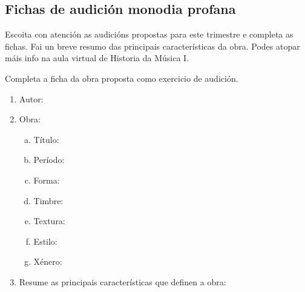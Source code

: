 \subsection*{Fichas de audición monodia profana}
%
Escoita con atención as audicións propostas para este trimestre e completa as fichas. Fai un breve resumo das principais características da obra.
Podes atopar máis info na aula virtual de Historia da Música I.
%
\begin{multicols}{2}
\begin{ejercicio}
%
Completa a ficha da obra proposta como exercicio de audición.
%
	\begin{enumerate}[1.-]
        \vspace*{0.3cm}
		\item
			Autor: \dotfill
			\vspace*{0.3cm}
		\item
			Obra:
			\begin{enumerate}[a)]
			    \item Título: \dotfill \vspace*{0.3cm}
			    \item Período: \dotfill \vspace*{0.3cm}
			    \item Forma: \dotfill \vspace*{0.3cm}
			    \item Timbre: \dotfill \vspace*{0.3cm} 		
			    \item Textura: \dotfill \vspace*{0.3cm}
			    \item Estilo: \dotfill \vspace*{0.3cm}
			    \item Xénero: \dotfill \vspace*{0.3cm}
			\end{enumerate}
		\item 
		    Resume as principais características que definen a obra:
			\vspace*{8.0cm}			


\end{enumerate}
\end{ejercicio}
\end{multicols}
